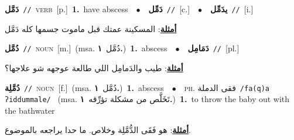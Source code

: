 \documentclass[10pt,a4paper,twoside]{article} %
\begin{document}
\begin{multicols}{2}
{\setlength\topsep{0pt}\textbf{\foreignlanguage{arabic}{دَمَّل}}\ {\color{gray}\texttt{//}\color{black}}\ \textsc{verb}\ [p.]\ \textbf{1.}~have abscess\ \ $\bullet$\ \ \setlength\topsep{0pt}\textbf{\foreignlanguage{arabic}{دَمِّل}}\ {\color{gray}\texttt{//}\color{black}}\ [c.]\ \ $\bullet$\ \ \setlength\topsep{0pt}\textbf{\foreignlanguage{arabic}{يدَمِّل}}\ {\color{gray}\texttt{//}\color{black}}\ [i.]\  \begin{flushright}\color{gray}\foreignlanguage{arabic}{\textbf{\underline{\foreignlanguage{arabic}{أمثلة}}}: المسكينة عمتك قبل ماموت جسمها كله دَمَّل}\end{flushright}\color{black}} \vspace{2mm}

{\setlength\topsep{0pt}\textbf{\foreignlanguage{arabic}{دُمَّل}}\ {\color{gray}\texttt{//}\color{black}}\ \textsc{noun}\ [m.]\ \color{gray}(msa. \foreignlanguage{arabic}{دُمَّل}~\foreignlanguage{arabic}{\textbf{١.}})\color{black}\ \textbf{1.}~abscess\ \ $\bullet$\ \ \setlength\topsep{0pt}\textbf{\foreignlanguage{arabic}{دَمَامِل}}\ {\color{gray}\texttt{//}\color{black}}\ [pl.]\  \begin{flushright}\color{gray}\foreignlanguage{arabic}{\textbf{\underline{\foreignlanguage{arabic}{أمثلة}}}: طيب والدَمامِل اللي طالعة عوجهه شو علاجها؟}\end{flushright}\color{black}} \vspace{2mm}

{\setlength\topsep{0pt}\textbf{\foreignlanguage{arabic}{دُمَّلِة}}\ {\color{gray}\texttt{//}\color{black}}\ \textsc{noun}\ [f.]\ \color{gray}(msa. \foreignlanguage{arabic}{دُمَّل}~\foreignlanguage{arabic}{\textbf{١.}})\color{black}\ \textbf{1.}~abscess\ \ $\bullet$\ \ \textsc{ph.} \color{gray} \foreignlanguage{arabic}{فقى الدملة}\color{black}\ {\color{gray}\texttt{/{\sffamily fa(q)a ʔiddummale}/}\color{black}}\ \color{gray} (msa. \foreignlanguage{arabic}{تَخَلَّص من مشكلة تؤرِّقه}~\foreignlanguage{arabic}{\textbf{١.}})\color{black}\ \textbf{1.}~to throw the baby out with the bathwater\  \begin{flushright}\color{gray}\foreignlanguage{arabic}{\textbf{\underline{\foreignlanguage{arabic}{أمثلة}}}: هو فَقَى الدُّمَّلِة وخلاص. ما حدا يراجعه بالموضوع.}\end{flushright}\color{black}} \vspace{2mm}


\end{multicols}
\end{document}
